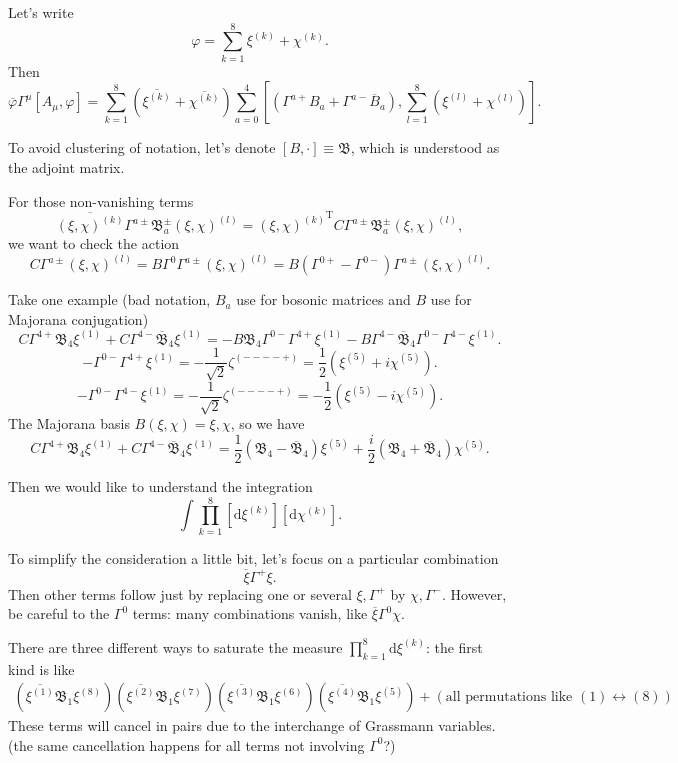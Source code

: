 Let's write 
\[
	\varphi = \sum_{k=1}^8 \xi^{(k)} +  \chi^{(k)}
.\] 
Then
\[
	\overline{\varphi} \Gamma^\mu [A_\mu,\varphi]
	=  \sum_{k=1}^8 \left( \overline{\xi^{(k)}} + \overline{\chi^{(k)}}  \right) 
	\sum_{a=0}^4 [\left( \Gamma^{a+} B_a + \Gamma^{a-} \overline{B}_a \right) ,
	\sum_{l=1}^8 \left(\xi^{(l)} +  \chi^{(l)}  \right) ]
.\] 

To avoid clustering of notation, let's denote
$ [B,\cdot] \equiv \mathfrak{B}$, which is understood as the adjoint matrix.

For those non-vanishing terms
\[
	\overline{(\xi,\chi)^{(k)}} \Gamma^{a \pm} \mathfrak{B}^\pm_a 
	(\xi,\chi)^{(l)}
	=
	{(\xi,\chi)^{(k)}}^{\text{T}} C \Gamma^{a \pm} \mathfrak{B}^\pm_a 
	(\xi,\chi)^{(l)}
,\] 
we want to check the action
\[
	C \Gamma^{a\pm} (\xi,\chi)^{(l)} = B \Gamma^0 \Gamma^{a\pm} (\xi,\chi)^{(l)} = B (\Gamma^{0+} - \Gamma^{0-})\Gamma^{a\pm} (\xi,\chi)^{(l)}
.\] 

Take one example (bad notation, $B_a$ use for bosonic matrices and $B$ use for Majorana conjugation)
\[
	C \Gamma^{4+} \mathfrak{B}_4 \xi^{(1)} 
	+ C \Gamma^{4-} \overline{\mathfrak{B}}_4 \xi^{(1)}
	=
	-B \mathfrak{B}_4 \Gamma^{0-}\Gamma^{4+}\xi^{(1)} 
	- B \Gamma^{4-} \overline{\mathfrak{B}}_4\Gamma^{0-}\Gamma^{4-} \xi^{(1)}
.\] 
\[
	-\Gamma^{0-}\Gamma^{4+}\xi^{(1)} = -\frac{1}{\sqrt{2}}
	\zeta^{(----+)} = \frac{1}{2} (\xi^{(5)} + i \chi^{(5)})
.\] 
\[
	-\Gamma^{0-}\Gamma^{4-}\xi^{(1)} = -\frac{1}{\sqrt{2}}
	\zeta^{(----+)} = -\frac{1}{2} (\xi^{(5)} - i \chi^{(5)})
.\] 
The Majorana basis $B (\xi,\chi) = \xi,\chi$, so we have
\[
	C \Gamma^{4+} \mathfrak{B}_4 \xi^{(1)} 
	+ C \Gamma^{4-} \overline{\mathfrak{B}}_4 \xi^{(1)}
	= \frac{1}{2} \left( \mathfrak{B}_4 - \overline{\mathfrak{B}}_4 \right)\xi^{(5)} 
	+ \frac{i}{2} (\mathfrak{B}_4 + \overline{\mathfrak{B}}_4)\chi^{(5)}
.\] 

Then we would like to understand the integration
\[
	\int \prod_{k=1}^8 [\mathrm{d}\xi^{(k)}] [\mathrm{d}\chi^{(k)}]
.\] 

To simplify the consideration a little bit,
let's focus on a particular combination
\[
\overline{\xi} \Gamma^+ \xi
.\] 
Then other terms follow just by replacing one or several $\xi,\Gamma^+$
by $\chi,\Gamma^-$.
However, be careful to the $\Gamma^0$ terms:
many combinations vanish, like $\overline{\xi}\Gamma^0 \chi$.


There are three different ways to saturate the measure
$\prod_{k=1}^8 \mathrm{d}\xi^{(k)}$:
the first kind is like
\begin{align*}
	(\overline{\xi^{(1)}} \mathfrak{B}_1 \xi^{(8)})
	(\overline{\xi^{(2)}} \mathfrak{B}_1 \xi^{(7)})
	(\overline{\xi^{(3)}} \mathfrak{B}_1 \xi^{(6)})
	(\overline{\xi^{(4)}} \mathfrak{B}_1 \xi^{(5)})
	+ (\text{all permutations like $(1) \leftrightarrow (8)$})
\end{align*}
These terms will cancel in pairs due to the interchange of Grassmann variables.
(the same cancellation happens for all terms not involving $\Gamma^0$?)
